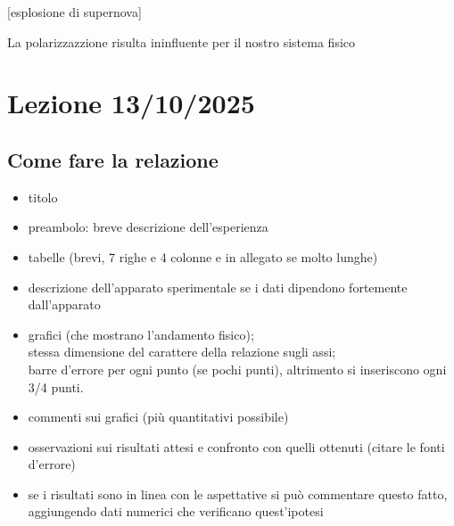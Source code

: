 \documentclass{article}
\begin{document}
\begin{center}
\label{fig:esplosione}[esplosione di supernova]
\end{center}

La polarizzazzione risulta ininfluente per il nostro sistema fisico 


\pagebreak
\section{Lezione 13/10/2025}
\subsection{Come fare la relazione}
\begin{itemize}
  \item titolo
  \item preambolo: breve descrizione dell'esperienza
  \item tabelle (brevi, 7 righe e 4 colonne e in allegato se molto lunghe)
  \item descrizione dell'apparato sperimentale se i dati dipendono fortemente dall'apparato
  \item grafici (che mostrano l'andamento fisico);\\ stessa dimensione del carattere della relazione sugli assi; \\barre d'errore per ogni punto (se pochi punti), altrimento si inseriscono ogni 3/4 punti. 
  \item commenti sui grafici (più quantitativi possibile)
  \item osservazioni sui risultati attesi e confronto con quelli ottenuti (citare le fonti d'errore)
  \item se i risultati sono in linea con le aspettative si può commentare questo fatto, aggiungendo dati numerici che verificano quest'ipotesi
\end{itemize}
\end{document}
